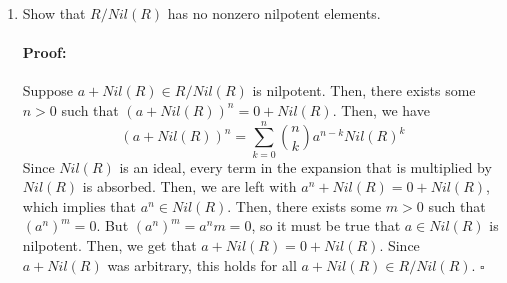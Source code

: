 \documentclass [12pt] {article}
\newenvironment{proof}{\paragraph{Proof:}}{\hfill$\square$}
\begin{document}
\begin{enumerate}
    \item Show that $R/Nil(R)$ has no nonzero nilpotent elements.
        \begin{proof}
            Suppose $a + Nil(R) \in R/Nil(R)$ is nilpotent. Then, there exists some $n > 0$ such 
            that $(a + Nil(R))^n = 0 + Nil(R)$. Then, we have
            \[(a + Nil(R))^n = \sum^n_{k = 0} \binom{n}{k} a^{n - k} Nil(R)^k\]
            Since $Nil(R)$ is an ideal, every term in the expansion that is multiplied by $Nil(R)$
            is absorbed. Then, we are left with $a^n + Nil(R) = 0 + Nil(R)$, which implies that 
            $a^n \in Nil(R)$. Then, there exists some $m > 0$ such that $(a^n)^m = 0$. But
            $(a^n)^m = a^nm = 0$, so it must be true that $a \in Nil(R)$ is nilpotent. Then, we 
            get that $a + Nil(R) = 0 + Nil(R)$. Since $a + Nil(R)$ was arbitrary, this holds for all
            $a + Nil(R) \in R/Nil(R)$.
        \end{proof}
\end{enumerate}
\newpage
\end{document}
